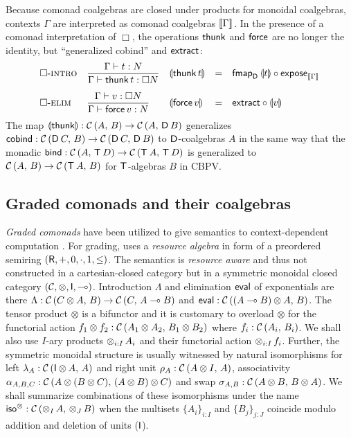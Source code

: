 \documentclass[acmsmall,review,anonymous]{acmart}\settopmatter{printfolios=true,printccs=false,printacmref=false}
\theoremstyle{remark}
\begin{document}
Because comonad coalgebras are closed under products for monoidal
coalgebras, contexts $\Gamma$ are interpreted as comonad coalgebras
$\den\Gamma$.  In the presence of a comonad interpretation of $\Box$,
the operations $\tthunk$ and $\tforce$ are no longer the identity, but
``generalized cobind'' and $\extract$:
\[
\begin{array}{lllcl}
 \rintro\Box
  & \ru{\oCompTy \Gamma t N
      }{\ValTy \Gamma {\thunk t} {\Box N}}
  & \dent{\thunk t} & = & \fmap[\D]{\dent t} \comp \expose[\den\Gamma]
\\[3ex]
 \relim\Box
  & \ru{\ValTy \Gamma v {\Box N}
      }{\oCompTy \Gamma {\force v} N}
  & \dent{\force v} & = & \textract \comp \dent v
\end{array}
\]
The map $\dent\tthunk : \Hom A B \to \Hom A {\D\,B}$ generalizes
$\tcobind : \Hom{\D\,C} B \to \Hom{\D\,C}{\D\,B}$ to $\D$-coalgebras
$A$ in the same way that the monadic
$\tbind : \Hom{A}{\T\,D} \to \Hom{\T\,A}{\T\,D}$ is generalized to
$\Hom{A}{B} \to \Hom{\T\,A}{B}$ for $\T$-algebras $B$ in CBPV.



\subsection{Graded comonads and their coalgebras}

\emph{Graded comonads} have been utilized to give semantics to
context-dependent computation \citep{orchard:icfp14}.  For grading,
\loccit uses a \emph{resource algebra} in form of a preordered
semiring
$(\R,{+},0,{\cdot},1,{\leq})$.
%
The semantics is \emph{resource aware} and thus not constructed in a
cartesian-closed category but in a symmetric monoidal closed category
$(\CC,\otimes,\I,\lolli)$.
Introduction $\Lambda$ and elimination $\teval$ of
exponentials are there
$\Lambda : \Hom {C \otimes A} B \to \Hom C {A \lolli B}$
and $\teval : \Hom{(A \lolli B) \otimes A} B$.  The tensor product
$\otimes$ is a bifunctor and it is customary to overload $\otimes$ for
the functorial action
$f_1 \otimes f_2 : \Hom{A_1 \otimes A_2}{B_1 \otimes B_2}$ where
$f_i : \Hom{A_i}{B_i}$.  We shall also use $I$-ary products
$\tupt {i:I} {A_i}$ and their functorial action $\tupt {i:I} {f_i}$.
Further, the symmetric monoidal structure is usually witnessed by
natural
isomorphisms for left $\lambda_A : \Hom {\I \otimes A} A$ and right
unit $\rho_A : \Hom {A \otimes I} A$, associativity
$\Ga_{A,B,C} : \Hom{A \otimes (B \otimes C)} {(A \otimes B) \otimes
  C}$
and swap $\sigma_{A,B} : \Hom {A \otimes B} {B \otimes A}$.  We shall
summarize combinations of these isomorphisms under the name
$\isot : \Hom {\tupt I A} {\tupt J B}$ when the multisets
$\{A_i\}_{i:I}$ and $\{B_j\}_{j:J}$ coincide modulo addition and
deletion of units ($\I$).
\end{document}
